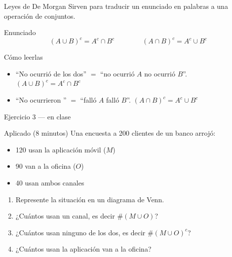 \documentclass[aspectratio=169,10pt]{beamer}
\begin{document}
\begin{frame}{Leyes de De Morgan}
  Sirven para traducir un enunciado en palabras a una operación de conjuntos.

  \vspace{0.35cm}
  \begin{block}{Enunciado}
    \[ (A\cup B)^{c}=A^{c}\cap B^{c} \qquad\qquad
       (A\cap B)^{c}=A^{c}\cup B^{c} \]
  \end{block}

  \vspace{0.3cm}
  \begin{exampleblock}{Cómo leerlas}
    \begin{itemize}
      \item ``No ocurrió  de los dos'' $=$ ``no ocurrió $A$
             no ocurrió $B$''. \quad $(A\cup B)^{c}=A^{c}\cap B^{c}$
      \item ``No ocurrieron '' $=$ ``falló $A$  falló
            $B$''. \quad $(A\cap B)^{c}=A^{c}\cup B^{c}$
    \end{itemize}
  \end{exampleblock}
\end{frame}

\begin{frame}{Ejercicio 3 — en clase}
  \begin{alertblock}{Aplicado (8 minutos)}
    Una encuesta a 200 clientes de un banco arrojó:
    \begin{itemize}
      \item 120 usan la aplicación móvil ($M$)
      \item 90 van a la oficina ($O$)
      \item 40 usan ambos canales
    \end{itemize}

    \vspace{0.25cm}
    \begin{enumerate}
      \item Represente la situación en un diagrama de Venn.
      \item ¿Cuántos usan  un canal, es decir $\#(M\cup O)$?
      \item ¿Cuántos  usan ninguno de los dos, es decir
            $\#(M\cup O)^{c}$?
      \item ¿Cuántos usan la aplicación  van a la oficina?
    \end{enumerate}
  \end{alertblock}
\end{frame}
\end{document}

